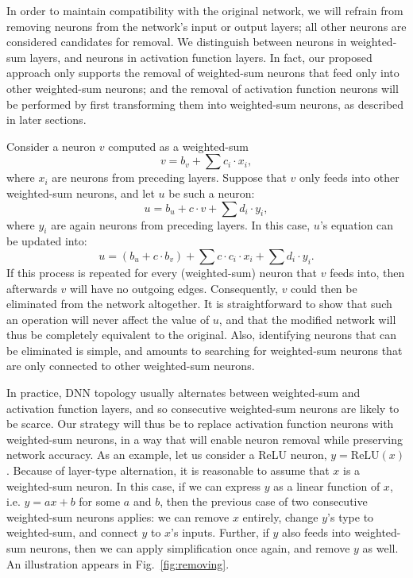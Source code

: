 \documentclass[10pt, conference, twocolumn, compsocconf]{IEEEtran}
\theoremstyle{remark}
\newcommand{\relu}{\text{ReLU}\xspace}
\begin{document}
In order to maintain compatibility with the original network, we will
refrain from removing neurons from the network's input or output
layers; all other neurons are considered candidates for removal. We
distinguish between neurons in weighted-sum layers, and neurons in
activation function layers. In fact, our proposed approach only
supports the removal of weighted-sum neurons that feed only into other
weighted-sum neurons; and the removal of activation function neurons
will be performed by first transforming them into weighted-sum
neurons, as described in later sections.

Consider a neuron $v$ computed as a weighted-sum
\[
  v= b_v + \sum c_i \cdot x_i,
\]
where $x_i$ are neurons from preceding layers.
 Suppose that $v$ only feeds into other weighted-sum neurons, and let
 $u$ be such a neuron:
\[
  u = b_u  + c\cdot v +  \sum d_i \cdot y_i,
\]
where $y_i$ are again neurons from preceding layers. 
In this case, 
$u$'s equation can be updated into:
\[
  u = (b_u + c\cdot b_v) + \sum c\cdot c_i\cdot x_i + \sum d_i\cdot y_i.
\]
If this process is repeated for every (weighted-sum) neuron that $v$
feeds into, then afterwards $v$ will have no outgoing
edges. Consequently, $v$ could then  be eliminated from the network altogether.
It is straightforward to show that such an operation will never affect
the value of $u$, and that the modified network will thus be
completely equivalent to the original. Also, identifying neurons that
can be eliminated is simple, and amounts to searching for weighted-sum
neurons that are only connected to other weighted-sum neurons.

In practice, DNN topology usually alternates between weighted-sum and
activation function layers, and so consecutive weighted-sum neurons
are likely to be scarce. Our strategy will thus be to replace
activation function neurons with weighted-sum neurons, in a way that
will enable neuron removal while preserving network accuracy.  As an
example, let us consider a ReLU neuron, $y=\relu{}(x)$.
Because of layer-type alternation, it is reasonable to assume that $x$
is a weighted-sum neuron. In this case, if we can express $y$ as a linear
function of $x$, i.e. $y=ax+b$ for some $a$ and $b$, then the previous
case of two consecutive weighted-sum neurons applies: we can remove
$x$ entirely, change $y$'s type to weighted-sum, and connect $y$ to
$x$'s inputs. Further, if $y$ also feeds into
weighted-sum neurons, then we can apply simplification once again, and
remove $y$ as well. An illustration appears in Fig.~\ref{fig:removing}.
\end{document}
